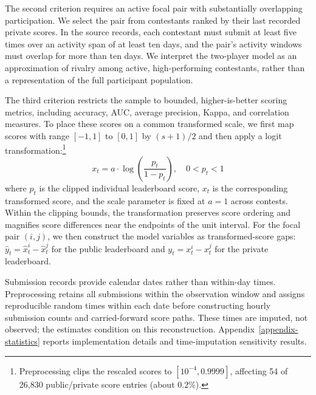 \documentclass[mnsc]{informs3}
\begin{document}
{The second criterion requires an active focal pair with substantially overlapping participation. We select the pair from contestants ranked by their last recorded private scores.}
In the source records, each contestant must submit at least five times over an activity span of at least ten days, and the pair's activity windows must overlap for more than ten days.
We interpret the two-player model as an approximation of rivalry among active, high-performing contestants, rather than a representation of the full participant population.

The third criterion restricts the sample to bounded, higher-is-better scoring metrics, including accuracy, AUC, average precision, Kappa, and correlation measures. To place these scores on a common transformed scale, we first map scores with range $[-1,1]$ to $[0,1]$ by $(s+1)/2$ and then apply a logit transformation:\footnote{Preprocessing clips the rescaled scores to $[10^{-4},0.9999]$, affecting 54 of 26,830 public/private score entries (about $0.2\%$).}
\begin{equation}\label{eq-leaderboard-transform}
x_t = a \cdot \log\left(\frac{p_t}{1-p_t}\right), \quad 0<p_t<1
\end{equation}
where $p_t$ is the clipped individual leaderboard score, $x_t$ is the corresponding transformed score, and the scale parameter is fixed at $a=1$ across contests.
Within the clipping bounds, the transformation preserves score ordering and magnifies score differences near the endpoints of the unit interval.
For the focal pair $(i,j)$, we then construct the model variables as transformed-score gaps: $\hat y_t=\hat x_t^i-\hat x_t^j$ for the public leaderboard and $y_t=x_t^i-x_t^j$ for the private leaderboard.

Submission records provide calendar dates rather than within-day times. Preprocessing retains all submissions within the observation window and assigns reproducible random times within each date before constructing hourly submission counts and carried-forward score paths. These times are imputed, not observed; the estimates condition on this reconstruction. Appendix~\ref{appendix-statistics} reports implementation details and time-imputation sensitivity results.
\end{document}
